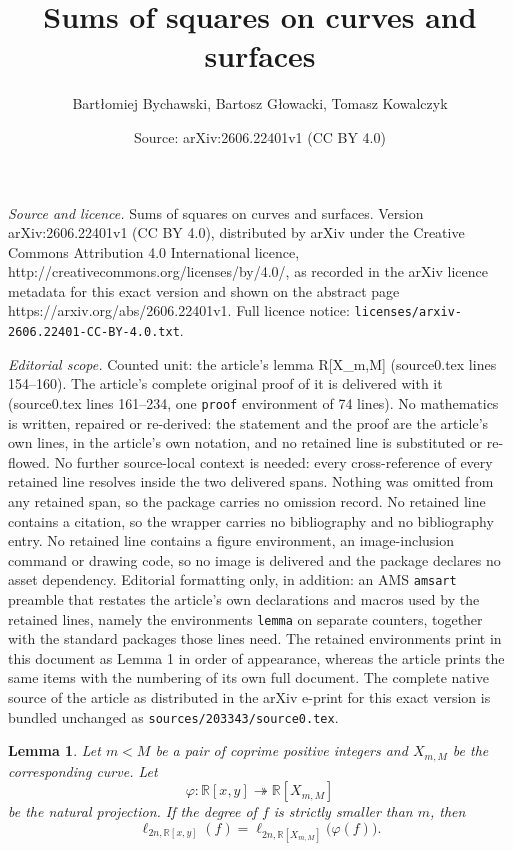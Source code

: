 \documentclass[10pt,a4paper]{amsart}
\title{Sums of squares on curves and surfaces}
\author{Bartłomiej Bychawski, Bartosz Głowacki, Tomasz Kowalczyk}
\date{Source: arXiv:2606.22401v1 (CC BY 4.0)}
\newtheorem{lemma}{Lemma}
\newcommand{\R}{\mathbb{R}}
\begin{document}
\maketitle

\noindent\emph{Source and licence.} Sums of squares on curves and surfaces. Version arXiv:2606.22401v1 (CC BY 4.0), distributed by arXiv under the Creative Commons Attribution 4.0 International licence, http://creativecommons.org/licenses/by/4.0/, as recorded in the arXiv licence metadata for this exact version and shown on the abstract page https://arxiv.org/abs/2606.22401v1. Full licence notice: \texttt{licenses/arxiv-2606.22401-CC-BY-4.0.txt}.\par\smallskip

\noindent\textit{Editorial scope.} Counted unit: the article's lemma R[X\_m,M] (source0.tex lines 154--160). The article's complete original proof of it is delivered with it (source0.tex lines 161--234, one \texttt{proof} environment of 74 lines). No mathematics is written, repaired or re-derived: the statement and the proof are the article's own lines, in the article's own notation, and no retained line is substituted or re-flowed.  No further source-local context is needed: every cross-reference of every retained line resolves inside the two delivered spans.  Nothing was omitted from any retained span, so the package carries no omission record.  No retained line contains a citation, so the wrapper carries no bibliography and no bibliography entry.  No retained line contains a figure environment, an image-inclusion command or drawing code, so no image is delivered and the package declares no asset dependency.  Editorial formatting only, in addition: an AMS \texttt{amsart} preamble that restates the article's own declarations and macros used by the retained lines, namely the environments \texttt{lemma} on separate counters, together with the standard packages those lines need.  The retained environments print in this document as Lemma 1 in order of appearance, whereas the article prints the same items with the numbering of its own full document.  The complete native source of the article as distributed in the arXiv e-print for this exact version is bundled unchanged as \texttt{sources/203343/source0.tex}.
\begin{lemma} \label{LEM: zachowywanie długości przy przejściu z R^2 na R[X_m,M]}
Let $m<M$ be a pair of coprime positive integers and $X_{m,M}$ be the corresponding curve.  Let  $$\varphi: \R[x,y] \twoheadrightarrow \R[X_{m,M}]$$ be the natural projection. If the degree of $f$ is strictly smaller than $m$, then
    $$
    \ell_{2n, \R[x,y]} (f) = \ell_{2n,\R[X_{m,M}]}\big(\varphi(f)\big).
    $$
   
\end{lemma}
\end{document}
